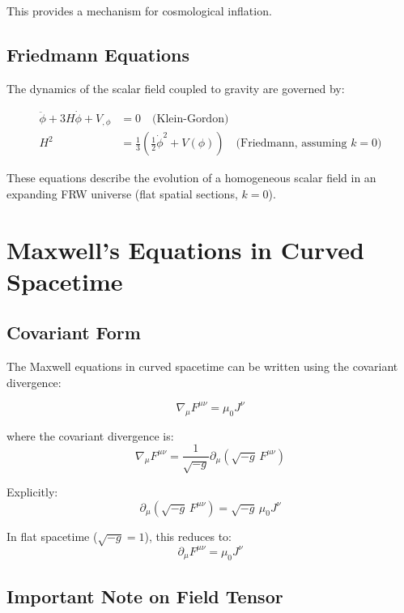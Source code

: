 \documentclass[11pt,a4paper]{article}
\begin{document}
This provides a mechanism for cosmological inflation.

\subsection{Friedmann Equations}

The dynamics of the scalar field coupled to gravity are governed by:

\begin{align}
\ddot{\phi} + 3H\dot{\phi} + V_{,\phi} &= 0 \quad \text{(Klein-Gordon)} \\
H^2 &= \frac{1}{3} \left( \frac{1}{2}\dot{\phi}^2 + V(\phi) \right) \quad \text{(Friedmann, assuming $k=0$)}
\end{align}

These equations describe the evolution of a homogeneous scalar field in an expanding FRW universe (flat spatial sections, $k=0$).

\section{Maxwell's Equations in Curved Spacetime}

\subsection{Covariant Form}

The Maxwell equations in curved spacetime can be written using the covariant divergence:

\begin{equation}
\boxed{\nabla_\mu F^{\mu\nu} = \mu_0 J^\nu}
\end{equation}

where the covariant divergence is:
\begin{equation}
\nabla_\mu F^{\mu\nu} = \frac{1}{\sqrt{-g}} \partial_\mu \left(\sqrt{-g} \, F^{\mu\nu}\right)
\end{equation}

Explicitly:
\begin{equation}
\partial_\mu \left(\sqrt{-g} \, F^{\mu\nu}\right) = \sqrt{-g} \, \mu_0 J^\nu
\end{equation}

In flat spacetime ($\sqrt{-g} = 1$), this reduces to:
\begin{equation}
\partial_\mu F^{\mu\nu} = \mu_0 J^\nu
\end{equation}

\subsection{Important Note on Field Tensor}
\end{document}
